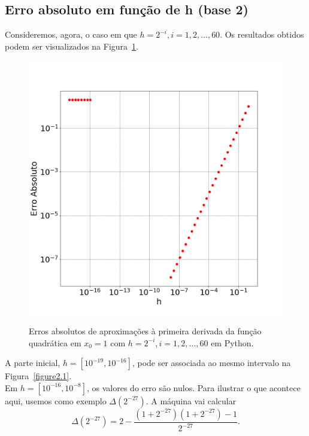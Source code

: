 \documentclass[aps,pre,twocolumn,showpacs,amsmath,amssymb]{revtex4-1}
\begin{document}
\subsection{Erro absoluto em função de h (base 2)}
Consideremos, agora, o caso em que $h=2^{-i}, i=1,2,\ldots,60$. Os resultados obtidos podem ser visualizados na Figura~\ref{figure2.2}.\\
\begin{figure}[ht]
   \begin{center}
    \includegraphics[width=\columnwidth]{erroh2.png} \\
	\caption{Erros absolutos de aproximações à primeira derivada da função quadrática em $x_0=1$ com $h=2^{-i}, i=1,2,\ldots,60$ em Python.}
  \label{figure2.2}
   \end{center}
\end{figure}
A parte inicial, $h=[10^{-19},10^{-16}]$, pode ser associada ao mesmo intervalo na Figura~\ref{figure2.1}.\\
Em $h=[10^{-16},10^{-8}]$, os valores do erro são nulos.
Para ilustrar o que acontece aqui, usemos como exemplo $\Delta(2^{-27})$. A máquina vai calcular
\begin{equation}
  \Delta(2^{-27})=2-\frac{(1+2^{-27})(1+2^{-27})-1}{2^{-27}}.
\end{equation}
\end{document}
